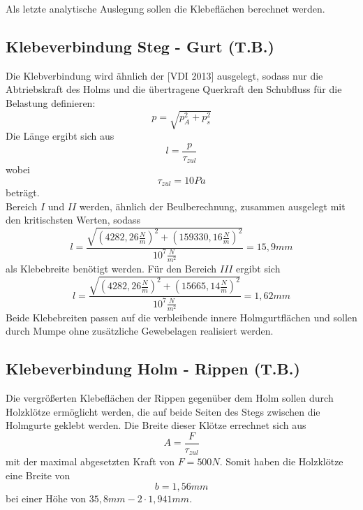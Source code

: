 Als letzte analytische Auslegung sollen die Klebeflächen berechnet werden.
\subsection{Klebeverbindung Steg - Gurt (T.B.)}
Die Klebverbindung wird ähnlich der [VDI 2013]  ausgelegt, sodass nur die Abtriebskraft des Holms und die übertragene Querkraft den Schubfluss für die Belastung definieren:
\begin{equation}
	p=\sqrt{p_{A}^{2}+p_{s}^{2}}
\end{equation}
Die Länge ergibt sich aus 
\begin{equation}
	l=\frac{p}{\tau_{zul}}
\end{equation}
wobei 
\begin{equation}
	\tau_{zul}=10 Pa
\end{equation}
beträgt.\\

\noindent Bereich $I$ und $II$ werden, ähnlich der Beulberechnung, zusammen ausgelegt mit den kritischsten Werten, sodass 
\begin{equation}
	l=\frac{\sqrt{(4282,26\frac{N}{m})^{2}+(159330,16\frac{N}{m})^{2}}}{10^{7}\frac{N}{m^{2}}}=15,9mm
\end{equation}
als Klebebreite benötigt werden. Für den Bereich $III$ ergibt sich
\begin{equation}
	l=\frac{\sqrt{(4282,26\frac{N}{m})^{2}+(15665,14\frac{N}{m})^{2}}}{10^{7}\frac{N}{m^{2}}}=1,62mm
\end{equation}
Beide Klebebreiten passen auf die verbleibende innere Holmgurtflächen und sollen durch Mumpe ohne zusätzliche Gewebelagen realisiert werden.

\subsection{Klebeverbindung Holm - Rippen (T.B.)}
Die vergrößerten Klebeflächen der Rippen gegenüber dem Holm sollen durch Holzklötze ermöglicht werden, die auf beide Seiten des Stegs zwischen die Holmgurte geklebt werden. Die Breite dieser Klötze errechnet sich aus 
\begin{equation}
	A=\frac{F}{\tau_{zul}}
\end{equation}
mit der maximal abgesetzten Kraft von $F=500N$.
Somit haben die Holzklötze eine Breite von 
\begin{equation}
	b=1,56mm
\end{equation}
bei einer Höhe von $35,8mm-2\cdot 1,941mm$.